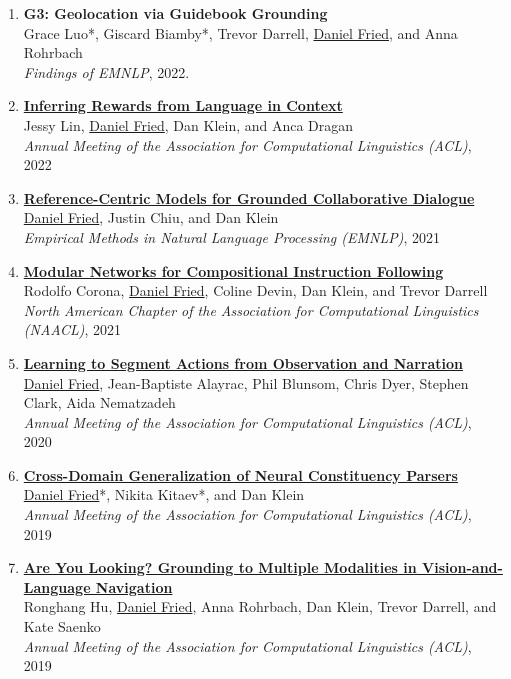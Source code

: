 \begin{enumerate}[leftmargin=-1mm,partopsep=0pt]
\item \textbf{G3: Geolocation via Guidebook Grounding} \\
  Grace Luo*, Giscard Biamby*, Trevor Darrell, \underline{Daniel Fried}, and Anna Rohrbach \\
  \emph{Findings of EMNLP}, 2022.

\item \href{https://arxiv.org/abs/2204.02515}{\textbf{Inferring Rewards from Language in Context}} \\
  Jessy Lin, \underline{Daniel Fried}, Dan Klein, and Anca Dragan \\
  \emph{Annual Meeting of the Association for Computational Linguistics (ACL)}, 2022 

\item \href{https://arxiv.org/abs/2109.05042}{\textbf{Reference-Centric Models for Grounded Collaborative Dialogue}} \\
    \underline{Daniel Fried}, Justin Chiu, and Dan Klein \\
    \emph{Empirical Methods in Natural Language Processing (EMNLP)}, 2021 

\item \href{https://arxiv.org/abs/2010.12764}{\textbf{Modular Networks for Compositional Instruction Following}} \\
    Rodolfo Corona, \underline{Daniel Fried}, Coline Devin, Dan Klein, and Trevor Darrell \\
    \emph{North American Chapter of the Association for Computational Linguistics (NAACL)}, 2021 

  \item \href{https://arxiv.org/abs/2005.03684}{\textbf{Learning to Segment Actions from Observation and Narration}} \\
    \underline{Daniel Fried}, Jean-Baptiste Alayrac, Phil Blunsom, Chris Dyer, Stephen Clark, Aida Nematzadeh \\
    \emph{Annual Meeting of the Association for Computational Linguistics (ACL)}, 2020

  \item \href{https://arxiv.org/abs/1907.04347}{\textbf{Cross-Domain Generalization of Neural Constituency Parsers}} \\
    \underline{Daniel Fried}*, Nikita Kitaev*, and Dan Klein \\
    \emph{Annual Meeting of the Association for Computational Linguistics (ACL)}, 2019

  \item \href{https://arxiv.org/abs/1906.00347}{\textbf{Are You Looking? Grounding to Multiple Modalities in Vision-and-Language Navigation}} \\
    Ronghang Hu, \underline{Daniel Fried}, Anna Rohrbach, Dan Klein, Trevor Darrell, and Kate Saenko \\
    \emph{Annual Meeting of the Association for Computational Linguistics (ACL)}, 2019


\end{enumerate}
